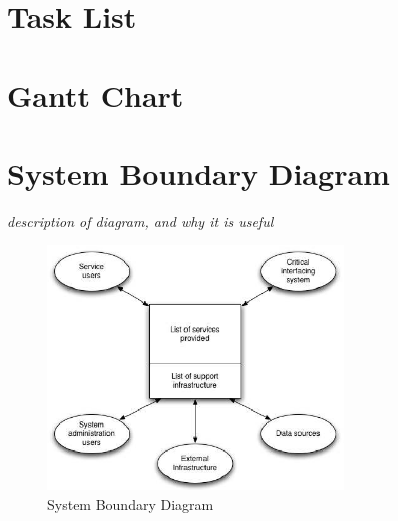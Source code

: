 \section{Task List}


\section{Gantt Chart}


\section{System Boundary Diagram}
\textit{description of diagram, and why it is useful}
\begin{figure}[h]
    \centering
    \includegraphics[width=0.7\textwidth]{images/requirements/system_boundary_diagram.png}
    \caption{System Boundary Diagram}
    \label{fig:sys_boundary_diag}
\end{figure}
